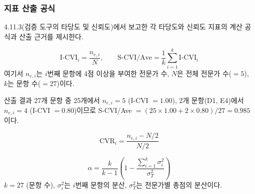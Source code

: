 \subsubsection{ 지표 산출 공식}
\label{app:reliability-formulas}

4.11.3(검증 도구의 타당도 및 신뢰도)에서 보고한 각 타당도와 신뢰도
지표의 계산 공식과 산출 근거를 제시한다.

\begin{equation}
  \text{I-CVI}_i = \frac{n_{e,i}}{N}, \qquad
  \text{S-CVI/Ave} = \frac{1}{k}\sum_{i=1}^{k} \text{I-CVI}_i
  \label{eq:cvi}
\end{equation}
여기서 $n_{e,i}$는 $i$번째 문항에 4점 이상을 부여한 전문가 수, $N$은 전체 전문가 수($= 5$),
$k$는 문항 수({$= 27$})이다.

{산출 결과 27개 문항 중 25개에서 $n_{e,i} = 5$ (I-CVI $= 1.00$),
2개 문항(D1, E4)에서 $n_{e,i} = 4$ (I-CVI $= 0.80$)이므로
S-CVI/Ave $= (25 \times 1.00 + 2 \times 0.80)/27 = 0.985$이다.}

\begin{equation}
  \text{CVR}_i = \frac{n_{e,i} - N/2}{N/2}
  \label{eq:cvr}
\end{equation}



\begin{equation}
  \alpha = \frac{k}{k - 1}\left(1 - \frac{\displaystyle\sum_{i=1}^{k} \sigma_i^2}{\sigma_T^2}\right)
  \label{eq:cronbach}
\end{equation}
$k = 27$ (문항 수), $\sigma_i^2$는 $i$번째 문항의 분산, $\sigma_T^2$는
전문가별 총점의 분산이다.


